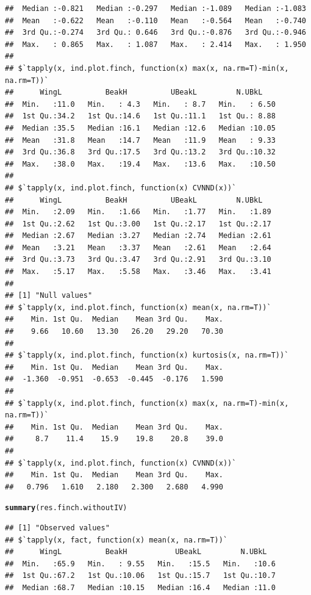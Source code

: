 \documentclass[12pt]{article}\usepackage[]{graphicx}\usepackage[]{color}
\makeatletter
\newcommand{\hlstd}[1]{\textcolor[rgb]{0.345,0.345,0.345}{#1}}%
\newcommand{\hlkwd}[1]{\textcolor[rgb]{0.737,0.353,0.396}{\textbf{#1}}}%
\newenvironment{kframe}{%
 \def\at@end@of@kframe{}%
 \ifinner\ifhmode%
  \def\at@end@of@kframe{\end{minipage}}%
  \begin{minipage}{\columnwidth}%
 \fi\fi%
 \def\FrameCommand##1{\hskip\@totalleftmargin \hskip-\fboxsep
 \colorbox{shadecolor}{##1}\hskip-\fboxsep
     \hskip-\linewidth \hskip-\@totalleftmargin \hskip\columnwidth}%
 \MakeFramed {\advance\hsize-\width
   \@totalleftmargin\z@ \linewidth\hsize
   \@setminipage}}%
 {\par\unskip\endMakeFramed%
 \at@end@of@kframe}
\newenvironment{knitrout}{}{} %
\makeatother
\begin{document}
\begin{knitrout}
\begin{kframe}
\begin{verbatim}
##  Median :-0.821   Median :-0.297   Median :-1.089   Median :-1.083  
##  Mean   :-0.622   Mean   :-0.110   Mean   :-0.564   Mean   :-0.740  
##  3rd Qu.:-0.274   3rd Qu.: 0.646   3rd Qu.:-0.876   3rd Qu.:-0.946  
##  Max.   : 0.865   Max.   : 1.087   Max.   : 2.414   Max.   : 1.950  
## 
## $`tapply(x, ind.plot.finch, function(x) max(x, na.rm=T)-min(x, na.rm=T))`
##      WingL          BeakH          UBeakL         N.UBkL     
##  Min.   :11.0   Min.   : 4.3   Min.   : 8.7   Min.   : 6.50  
##  1st Qu.:34.2   1st Qu.:14.6   1st Qu.:11.1   1st Qu.: 8.88  
##  Median :35.5   Median :16.1   Median :12.6   Median :10.05  
##  Mean   :31.8   Mean   :14.7   Mean   :11.9   Mean   : 9.33  
##  3rd Qu.:36.8   3rd Qu.:17.5   3rd Qu.:13.2   3rd Qu.:10.32  
##  Max.   :38.0   Max.   :19.4   Max.   :13.6   Max.   :10.50  
## 
## $`tapply(x, ind.plot.finch, function(x) CVNND(x))`
##      WingL          BeakH          UBeakL         N.UBkL    
##  Min.   :2.09   Min.   :1.66   Min.   :1.77   Min.   :1.89  
##  1st Qu.:2.62   1st Qu.:3.00   1st Qu.:2.17   1st Qu.:2.17  
##  Median :2.67   Median :3.27   Median :2.74   Median :2.61  
##  Mean   :3.21   Mean   :3.37   Mean   :2.61   Mean   :2.64  
##  3rd Qu.:3.73   3rd Qu.:3.47   3rd Qu.:2.91   3rd Qu.:3.10  
##  Max.   :5.17   Max.   :5.58   Max.   :3.46   Max.   :3.41  
## 
## [1] "Null values"
## $`tapply(x, ind.plot.finch, function(x) mean(x, na.rm=T))`
##    Min. 1st Qu.  Median    Mean 3rd Qu.    Max. 
##    9.66   10.60   13.30   26.20   29.20   70.30 
## 
## $`tapply(x, ind.plot.finch, function(x) kurtosis(x, na.rm=T))`
##    Min. 1st Qu.  Median    Mean 3rd Qu.    Max. 
##  -1.360  -0.951  -0.653  -0.445  -0.176   1.590 
## 
## $`tapply(x, ind.plot.finch, function(x) max(x, na.rm=T)-min(x, na.rm=T))`
##    Min. 1st Qu.  Median    Mean 3rd Qu.    Max. 
##     8.7    11.4    15.9    19.8    20.8    39.0 
## 
## $`tapply(x, ind.plot.finch, function(x) CVNND(x))`
##    Min. 1st Qu.  Median    Mean 3rd Qu.    Max. 
##   0.796   1.610   2.180   2.300   2.680   4.990
\end{verbatim}
\begin{alltt}
\hlkwd{summary}\hlstd{(res.finch.withoutIV)}
\end{alltt}
\begin{verbatim}
## [1] "Observed values"
## $`tapply(x, fact, function(x) mean(x, na.rm=T))`
##      WingL          BeakH           UBeakL         N.UBkL    
##  Min.   :65.9   Min.   : 9.55   Min.   :15.5   Min.   :10.6  
##  1st Qu.:67.2   1st Qu.:10.06   1st Qu.:15.7   1st Qu.:10.7  
##  Median :68.7   Median :10.15   Median :16.4   Median :11.0  

\end{verbatim}
\end{kframe}
\end{knitrout}
\end{document}
